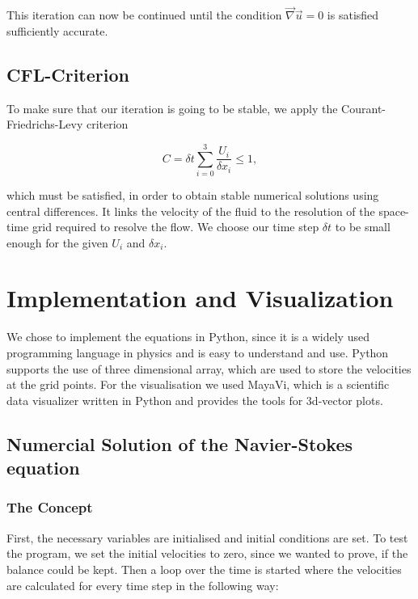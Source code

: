 \documentclass[12pt, a4paper]{article} %
\begin{document}
		This iteration can now be continued until the condition $\vec{\nabla}\vec{u}=0$ is satisfied sufficiently accurate. 
	
	\subsection{CFL-Criterion} %
		To make sure that our iteration is going to be stable, we apply the Courant-Friedrichs-Levy criterion
		
		\begin{equation}
			C = \delta t \sum_{i=0}^3 \frac{U_i}{\delta x_i} \leq 1 ,
			\label{eq:CFL}
		\end{equation}
		 
		which must be satisfied, in order to obtain stable numerical solutions using central differences. It links the velocity of the fluid to the resolution of the space-time grid required to resolve the flow. %
		We choose our time step $\delta t$ to be small enough for the given $U_i$ and $\delta x_i$.
		
		
	\newpage
\section{Implementation and Visualization}

	We chose to implement the equations in Python, since it is a widely used programming language in physics and is easy to understand and use. Python supports the use of three dimensional array, which are used to store the velocities at the grid points. For the visualisation we used MayaVi, which is a scientific data visualizer written in Python and provides the tools for 3d-vector plots.

	\subsection{Numercial Solution of the Navier-Stokes equation}
		
		\subsubsection{The Concept}
			
			First, the necessary variables are initialised and initial conditions are set. To test the program, we set the initial velocities to zero, since we wanted to prove, if the balance could be kept.
			Then a loop over the time is started where the velocities are calculated for every time step in the following way:\\
			
\end{document}
